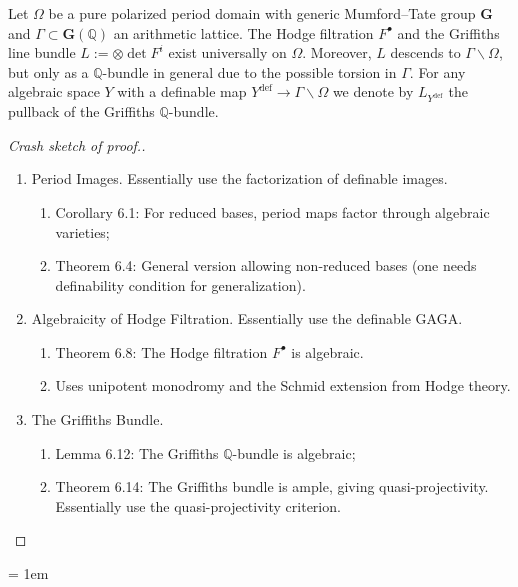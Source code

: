 \documentclass{amsart}
\theoremstyle{definition}
\numberwithin{equation}{section}
\newcommand{\definable}{\mathrm{def}}
\begin{document}
Let $\Omega$ be a pure polarized period domain with generic Mumford–Tate group $\mathbf{G}$
and $\Gamma \subset \mathbf{G}(\mathbb{Q})$ an arithmetic lattice.
The Hodge filtration $F^{\bullet}$ and the Griffiths line bundle $L := \otimes \det F^i$
exist universally on $\Omega$.
Moreover, $L$ descends to $\Gamma \backslash \Omega$, but only as a $\mathbb{Q}$-bundle in general
due to the possible torsion in $\Gamma$.
For any algebraic space $Y$ with a definable map $Y^\definable \to \Gamma \backslash \Omega$
we denote by $L_{Y^\definable}$ the pullback of the Griffiths $\mathbb{Q}$-bundle.

\begin{proof}[Crash sketch of proof.]~
\begin{enumerate}
	\item Period Images. Essentially use the factorization of definable images.
	\begin{enumerate}
		\item Corollary 6.1: For reduced bases, period maps factor through algebraic varieties;
		\item Theorem 6.4: General version allowing non-reduced bases (one needs definability condition for generalization).
	\end{enumerate}
	\item Algebraicity of Hodge Filtration. Essentially use the definable GAGA.
	\begin{enumerate}
		\item Theorem 6.8: The Hodge filtration $F^{\bullet}$ is algebraic.
		\item Uses unipotent monodromy and the Schmid extension from Hodge theory.
	\end{enumerate}
	\item The Griffiths Bundle.
	\begin{enumerate}
		\item Lemma 6.12: The Griffiths $\mathbb{Q}$-bundle is algebraic;
		\item Theorem 6.14: The Griffiths bundle is ample, giving quasi-projectivity. Essentially use the quasi-projectivity criterion.
	\end{enumerate}
\end{enumerate}
\end{proof}


\emergencystretch = 1em
\printbibliography
\end{document}
